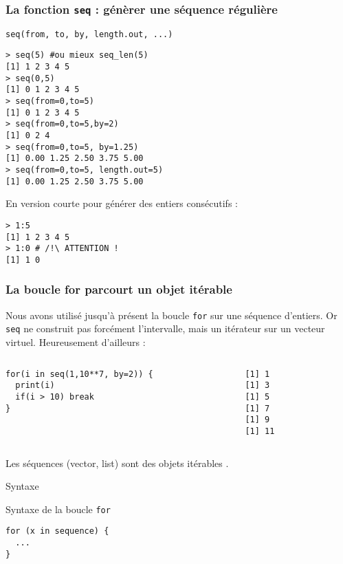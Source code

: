 \documentclass[10pt]{beamer}
\begin{document}
\begin{frame}[fragile]
  \frametitle{  La fonction \texttt{seq} : génèrer une séquence régulière}
  \begin{center}
    \alert{\texttt{seq(from, to, by, length.out, ...)}}
  \end{center}

\begin{lstlisting}
> seq(5) #ou mieux seq_len(5)
[1] 1 2 3 4 5
> seq(0,5)
[1] 0 1 2 3 4 5
> seq(from=0,to=5)
[1] 0 1 2 3 4 5
> seq(from=0,to=5,by=2)
[1] 0 2 4
> seq(from=0,to=5, by=1.25)
[1] 0.00 1.25 2.50 3.75 5.00
> seq(from=0,to=5, length.out=5)
[1] 0.00 1.25 2.50 3.75 5.00
\end{lstlisting}

En version courte pour générer des entiers consécutifs :   
\begin{lstlisting}
> 1:5
[1] 1 2 3 4 5
> 1:0 # /!\ ATTENTION ! 
[1] 1 0
\end{lstlisting}
\end{frame}



\begin{frame}[fragile]
  \frametitle{La boucle for parcourt un objet itérable}

  Nous avons utilisé jusqu'à présent la boucle \texttt{for} sur une séquence d’entiers.
  Or \texttt{seq} ne construit pas forcément l'intervalle, mais un itérateur sur un vecteur virtuel.
  Heureusement d'ailleurs :
\begin{columns}[t]
\begin{column}{0.58\textwidth}
  \begin{lstlisting}[style=editor]
for(i in seq(1,10**7, by=2)) {
  print(i)
  if(i > 10) break
}    
  \end{lstlisting}
\end{column}
\begin{column}{0.38\textwidth}
  \begin{lstlisting}
[1] 1
[1] 3
[1] 5
[1] 7
[1] 9
[1] 11
  \end{lstlisting}
\end{column}
\end{columns}

Les séquences (vector, list) sont des objets itérables .
\begin{block}{Syntaxe}
  
\end{block}{Syntaxe de la boucle \texttt{for}}
\begin{lstlisting}[style=edblock]
for (x in sequence) {
  ...
}  
\end{lstlisting}
  
\end{frame}
\end{document}
